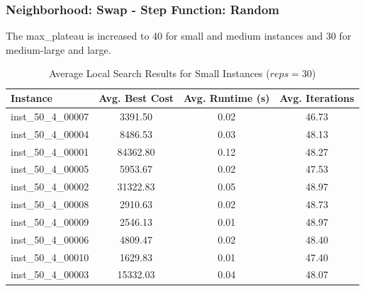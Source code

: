 \documentclass{article}
\begin{document}
\subsubsection*{Neighborhood: Swap - Step Function: Random}
The max\_plateau is increased to 40 for small and medium instances and 30 for medium-large and large.

\begin{table}[H]
\centering
\caption{Average Local Search Results for Small Instances ($reps = 30$)}

\hspace*{-1cm}
\begin{tabular}{lccc}
\toprule
\textbf{Instance} & \textbf{Avg. Best Cost} & \textbf{Avg. Runtime (s)} & \textbf{Avg. Iterations} \\
\midrule
inst\_50\_4\_00007 & 3391.50  & 0.02  & 46.73 \\
inst\_50\_4\_00004 & 8486.53  & 0.03  & 48.13 \\
inst\_50\_4\_00001 & 84362.80 & 0.12  & 48.27 \\
inst\_50\_4\_00005 & 5953.67  & 0.02  & 47.53 \\
inst\_50\_4\_00002 & 31322.83 & 0.05  & 48.97 \\
inst\_50\_4\_00008 & 2910.63  & 0.02  & 48.73 \\
inst\_50\_4\_00009 & 2546.13  & 0.01  & 48.97 \\
inst\_50\_4\_00006 & 4809.47  & 0.02  & 48.40 \\
inst\_50\_4\_00010 & 1629.83  & 0.01  & 47.40 \\
inst\_50\_4\_00003 & 15332.03 & 0.04  & 48.07 \\
\bottomrule
\end{tabular}
\label{tab:average_results_50_4}
\end{table}
\end{document}

